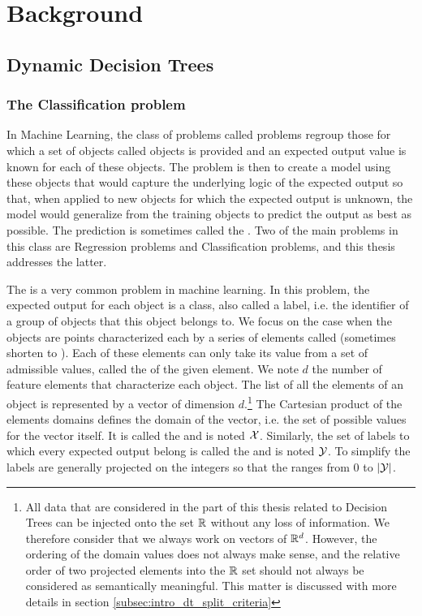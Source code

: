 \chapter{Background}
\section{Dynamic Decision Trees}
\subsection{The Classification problem} \label{subsec:intro_classification}
In Machine Learning, the class of problems called  problems regroup those for which a set of objects called  objects is provided and an expected output value is known for each of these objects. The problem is then to create a model using these objects that would capture the underlying logic of the expected output so that, when applied to new objects for which the expected output is unknown, the model would generalize from the training objects to predict the output as best as possible. The prediction is sometimes called the . Two of the main problems in this class are Regression problems and Classification problems, and this thesis addresses the latter.

The  is a very common problem in machine learning. In this problem, the expected output for each object is a class, also called a label, i.e. the identifier of a group of objects that this object belongs to. We focus on the case when the objects are points characterized each by a series of elements called  (sometimes shorten to ). Each of these elements can only take its value from a set of admissible values, called the  of the given element. We note $d$ the number of feature elements that characterize each object. The list of all the elements of an object is represented by a vector of dimension $d$.\footnote{All data that are considered in the part of this thesis related to Decision Trees can be injected onto the set $\mathbb{R}$ without any loss of information. We therefore consider that we always work on vectors of $\mathbb{R}^d$. However, the ordering of the domain values does not always make sense, and the relative order of two projected elements into the $\mathbb{R}$ set should not always be considered as semantically meaningful. This matter is discussed with more details in section \ref{subsec:intro_dt_split_criteria}} The Cartesian product of the elements domains defines the domain of the vector, i.e. the set of possible values for the vector itself. It is called the  and is noted $\mathcal{X}$. Similarly, the set of labels to which every expected output belong is called the  and is noted $\mathcal{Y}$. To simplify the labels are generally projected on the integers so that the  ranges from $0$ to $|\mathcal{Y}|$.

